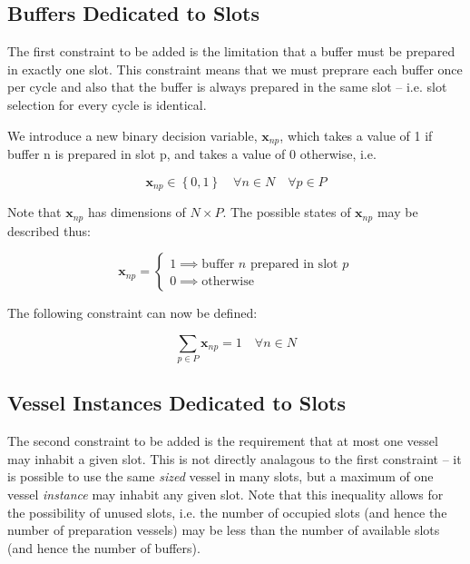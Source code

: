 \subsection{Buffers Dedicated to Slots}\label{SS.constr1}

The first constraint to be added is the limitation that a buffer must be 
prepared in exactly one slot.
This constraint means that we must preprare each buffer once per cycle
and also that the buffer is always prepared in the same slot -- i.e. slot
selection for every cycle is identical.

We introduce a new binary decision variable, $\boldsymbol{x}_{np}$, which takes
a value of 1 if buffer n is prepared in slot p, and takes a value of 0 
otherwise, i.e.

\begin{equation}
    \boldsymbol{x}_{np} \in \left\{ 0, 1 \right\} \quad \forall n \in N \quad
    \forall p \in P
    \label{eq.x}
\end{equation}

Note that $\boldsymbol{x}_{np}$ has dimensions of $N \times P$.
The possible states of $\boldsymbol{x}_{np}$ may be described thus:

\begin{equation}
    \boldsymbol{x}_{np} =
    \begin{cases}
        1 \implies \text{buffer $n$ prepared in slot $p$}\\
        0 \implies \text{otherwise}
    \end{cases}
\end{equation}

The following constraint can now be defined:

\begin{equation}
    \sum_{p \in P} \boldsymbol{x}_{np} = 1 \quad \forall n \in N
    \label{eq.constr1}
\end{equation}

\subsection{Vessel Instances Dedicated to Slots}\label{SS.constr2}

The second constraint to be added is the requirement that at most one vessel
may inhabit a given slot.
This is not directly analagous to the first constraint -- it is possible to 
use the same \emph{sized} vessel in many slots, but a maximum of one vessel 
\emph{instance} may inhabit any given slot.
Note that this inequality allows for the possibility of unused slots, i.e. the
number of occupied slots (and hence the number of preparation vessels) may be
less than the number of available slots (and hence the number of buffers).

